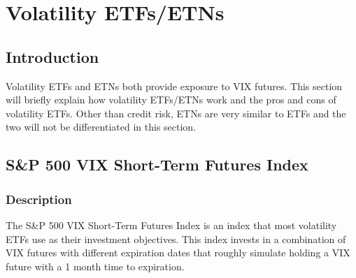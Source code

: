 \documentclass[11pt, oneside]{book}
\begin{document}
\chapter{Volatility ETFs/ETNs} \label{ETFs}
\section{Introduction}
Volatility ETFs and ETNs both provide exposure to VIX futures. This section will briefly explain how volatility ETFs/ETNs work and the pros and cons of volatility ETFs. Other than credit risk, ETNs are very similar to ETFs and the two will not be differentiated in this section.

\section{S\&P 500 VIX Short-Term Futures Index} \label{ETFs-Intro}
\subsection{Description} \label{ETFs-Index-Description}
The S\&P 500 VIX Short-Term Futures Index is an index that most volatility ETFs use as their investment objectives. This index invests in a combination of VIX futures with different expiration dates that roughly simulate holding a VIX future with a 1 month time to expiration. 
\end{document}
